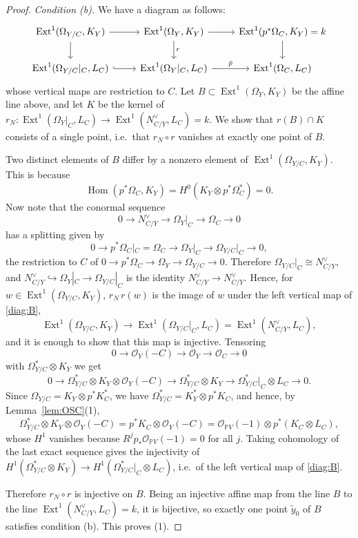 \documentclass[11pt,reqno]{amsart}
\theoremstyle{plain}
\theoremstyle{definition}
\newcommand{\PP}{\mathbb{P}}
\newcommand{\OO}{\mathcal{O}}
\newcommand{\Hom}{\operatorname{Hom}}
\newcommand{\Ext}{\operatorname{Ext}}
\newcommand{\yt}{\tilde{y}}
\begin{document}
\begin{proof}
\emph{Condition (b).} We have a diagram as follows:
\begin{equation}\label{diag:B}
\begin{tikzcd}
\Ext^1(\Omega_{Y/C},K_Y)\arrow[r]\arrow[d] & \Ext^1(\Omega_Y,K_Y)\arrow[r]\arrow[d,"r"] & \Ext^1(p^*\Omega_C,K_Y)=k\arrow[d]\\
\Ext^1(\Omega_{Y/C}|_C,L_C)\arrow[r,hook] & \Ext^1(\Omega_Y|_C,L_C)\arrow[r,"\bar p"] & \Ext^1(\Omega_C,L_C)
\end{tikzcd}
\end{equation}
whose vertical maps are restriction to $C$. Let $B\subset\Ext^1(\Omega_Y,K_Y)$ be the affine line above, and let $K$ be the kernel of $r_N\colon\Ext^1(\Omega_Y|_C,L_C)\to\Ext^1(N_{C/Y}^{\vee},L_C)=k$. We show that $r(B)\cap K$ consists of a single point, i.e.\ that $r_N\circ r$ vanishes at exactly one point of $B$.

Two distinct elements of $B$ differ by a nonzero element of $\Ext^1(\Omega_{Y/C},K_Y)$. This is because
\[
\Hom(p^*\Omega_C,K_Y)=H^0(K_Y\otimes p^*\Omega_C^{*})=0 .
\]
Now note that the conormal sequence
\[
0\to N_{C/Y}^{\vee}\to\Omega_Y|_C\to\Omega_C\to0
\]
has a splitting given by
\[
0\to p^*\Omega_C|_C=\Omega_C\to\Omega_Y|_C\to\Omega_{Y/C}|_C\to0 ,
\]
the restriction to $C$ of $0\to p^*\Omega_C\to\Omega_Y\to\Omega_{Y/C}\to0$. Therefore $\Omega_{Y/C}|_C\cong N_{C/Y}^{\vee}$, and $N_{C/Y}^{\vee}\hookrightarrow\Omega_Y|_C\to\Omega_{Y/C}|_C$ is the identity $N_{C/Y}^{\vee}\to N_{C/Y}^{\vee}$. Hence, for $w\in\Ext^1(\Omega_{Y/C},K_Y)$, $r_N\,r(w)$ is the image of $w$ under the left vertical map of \eqref{diag:B},
\[
\Ext^1(\Omega_{Y/C},K_Y)\to\Ext^1(\Omega_{Y/C}|_C,L_C)=\Ext^1(N_{C/Y}^{\vee},L_C),
\]
and it is enough to show that this map is injective. Tensoring
\[
0\to\OO_Y(-C)\to\OO_Y\to\OO_C\to0
\]
with $\Omega_{Y/C}^{*}\otimes K_Y$ we get
\[
0\to\Omega_{Y/C}^{*}\otimes K_Y\otimes\OO_Y(-C)\to\Omega_{Y/C}^{*}\otimes K_Y\to\Omega_{Y/C}^{*}|_C\otimes L_C\to0 .
\]
Since $\Omega_{Y/C}=K_Y\otimes p^*K_C^{*}$, we have $\Omega_{Y/C}^{*}=K_Y^{*}\otimes p^*K_C$, and hence, by Lemma~\ref{lem:OSC}(1),
\[
\Omega_{Y/C}^{*}\otimes K_Y\otimes\OO_Y(-C)=p^*K_C\otimes\OO_Y(-C)=\OO_{\PP V}(-1)\otimes p^*(K_C\otimes L_C),
\]
whose $H^1$ vanishes because $R^jp_*\OO_{\PP V}(-1)=0$ for all $j$. Taking cohomology of the last exact sequence gives the injectivity of $H^1(\Omega_{Y/C}^{*}\otimes K_Y)\to H^1(\Omega_{Y/C}^{*}|_C\otimes L_C)$, i.e.\ of the left vertical map of \eqref{diag:B}.

Therefore $r_N\circ r$ is injective on $B$. Being an injective affine map from the line $B$ to the line $\Ext^1(N_{C/Y}^{\vee},L_C)=k$, it is bijective, so exactly one point $\yt_0$ of $B$ satisfies condition (b). This proves (1).


\end{proof}
\end{document}
